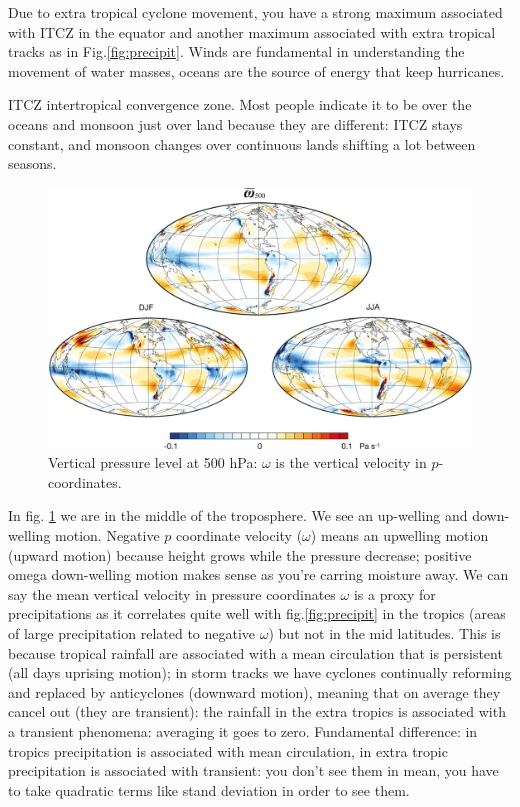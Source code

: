 Due to extra tropical cyclone movement, you have a strong maximum associated with ITCZ in the equator and another maximum associated with extra tropical tracks as in Fig.\ref{fig:precipit}. 
Winds are fundamental in understanding the movement of water masses, oceans are the source of energy that keep hurricanes. 

ITCZ intertropical convergence zone. Most people indicate it to be over the oceans and monsoon just over land because they are different: ITCZ stays constant, and monsoon changes over continuous lands shifting a lot between seasons.
\begin{figure}[htpb]
    \centering
    \includegraphics[width=0.5\linewidth]{uploads/Vertical p.png}
    \caption{Vertical pressure level at 500 hPa: $\omega$ is the vertical velocity in $p$-coordinates.}
    \label{fig:omega500}
\end{figure}
In fig. \ref{fig:omega500} we are in the middle of the troposphere. We see an up-welling and down-welling motion. Negative $p$ coordinate velocity ($\omega$) means an upwelling motion (upward motion) because height grows while the pressure decrease; positive omega down-welling motion makes sense as you're carring moisture away. We can say the mean vertical velocity in pressure coordinates $\omega$ is a proxy for precipitations as it correlates quite well with fig.\ref{fig:precipit} in the tropics (areas of large precipitation related to negative $\omega$) but not in the mid latitudes. This is because tropical rainfall are associated with a mean circulation that is persistent (all days uprising motion); in storm tracks we have cyclones continually reforming and replaced by anticyclones (downward motion), meaning that on average they cancel out (they are transient): the rainfall in the extra tropics is associated with a transient phenomena: averaging it goes to zero. Fundamental difference: in tropics precipitation is associated with mean circulation, in extra tropic precipitation is associated with transient: you don’t see them in mean, you have to take quadratic terms like stand deviation in order to see them. \\
[0.25 cm]



